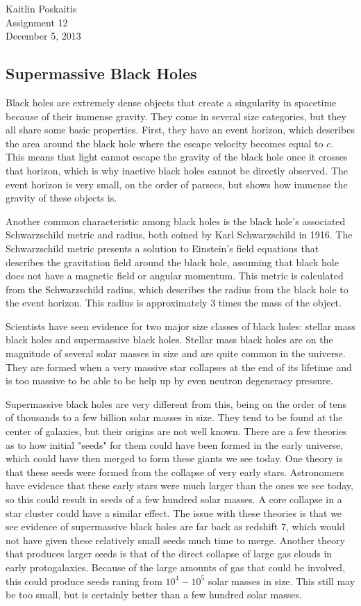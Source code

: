 \documentclass[12pt]{article}
\begin{document}
\noindent Kaitlin Poskaitis\\
Assignment 12\\
December 5, 2013
\begin{center}
    \section*{Supermassive Black Holes}
\end{center}

Black holes are extremely dense objects that create a singularity in spacetime
because of their immense gravity.  They come in several size categories, but
they all share some basic properties.  First, they have an event horizon, which
describes the area around the black hole where the escape velocity becomes equal
to $c$.  This means that light cannot escape the gravity of the black hole once
it crosses that horizon, which is why inactive black holes cannot be directly
observed.  The event horizon is very small, on the order of parsecs, but shows
how immense the gravity of these objects is.

Another common characteristic among black holes is the black hole's associated
Schwarzschild metric and radius, both coined by Karl Schwarzschild in 1916.
The Schwarzschild metric presents a solution
to Einstein's field equations that describes the gravitation field around the
black hole, assuming that black hole does not have a magnetic field or angular
momentum.  This metric is calculated from the Schwarzschild radius, which
describes the radius from the black hole to the event horizon.  This radius is
approximately 3 times the mass of the object.

Scientists have seen evidence for two major size classes of black holes:
stellar mass black holes and supermassive black holes.  Stellar mass black holes
are on the magnitude of several solar masses in size and are quite common in the
universe.  They are formed when a very massive star collapses at the end of its
lifetime and is too massive to be able to be help up by even neutron degeneracy
pressure.

Supermassive black holes are very different from this, being on the
order of tens of thousands to a few billion solar masses in size.  They tend to
be found at the center of galaxies, but their origins are not well known.  There
are a few theories as to how initial "seeds" for them could have been formed in
the early universe, which could have then merged to form these giants we see
today.  One theory is that these seeds were formed from the collapse of very
early stars.  Astronomers have evidence that these early stars were much larger
than the ones we see today, so this could result in seeds of a few hundred solar
masses.  A core collapse in a star cluster could have a similar effect.  The
issue with these theories is that we see evidence of supermassive black holes
are far back as redshift 7, which would not have given these relatively small
seeds much time to merge.  Another theory that produces larger seeds is that of
the direct collapse of large gas clouds in early protogalaxies.  Because of the
large amounts of gas that could be involved, this could produce seeds raning
from $10^4-10^5$ solar masses in size.  This still may be too small, but is
certainly better than a few hundred solar masses.
\end{document}

